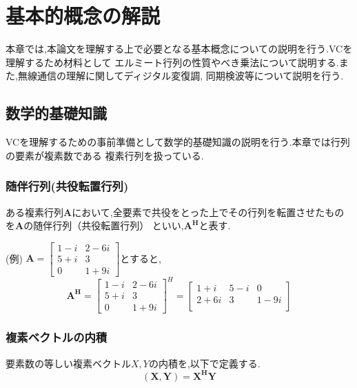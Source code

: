 \chapter{基本的概念の解説}
本章では,本論文を理解する上で必要となる基本概念についての説明を行う.VCを理解するため材料として
エルミート行列の性質やべき乗法について説明する.また,無線通信の理解に関してディジタル変復調,
同期検波等について説明を行う.

\section{数学的基礎知識}
VCを理解するための事前準備として数学的基礎知識の説明を行う.本章では行列の要素が複素数である
複素行列を扱っている.

\subsection{随伴行列(共役転置行列)}
ある複素行列$\bm{A}$において,全要素で共役をとった上でその行列を転置させたものを$\bm{A}$の随伴行列（共役転置行列）
といい,$\bm{A^H}$と表す.

(例)\quad
$
  \bm{A} = \left[
    \begin{array}{cc}
      1-i & 2-6i \\
      5+i & 3 \\
      0 & 1+9i
    \end{array}
  \right]
$とすると,
\vspace{1mm}
\begin{equation}
    \bm{A^H} = \left[
        \begin{array}{cc}
            1-i & 2-6i \\
            5+i & 3 \\
            0 & 1+9i
        \end{array}
    \right]^H 
    = \left[
        \begin{array}{ccc}
            1+i & 5-i & 0 \\
            2+6i & 3 & 1-9i \\
        \end{array}
    \right] \nonumber
\end{equation}

\subsection{複素ベクトルの内積}
要素数の等しい複素ベクトル$X,Y$の内積を,以下で定義する.
\begin{equation}
    (\bm{X},\bm{Y}) = \bm{X^HY}
\end{equation}

